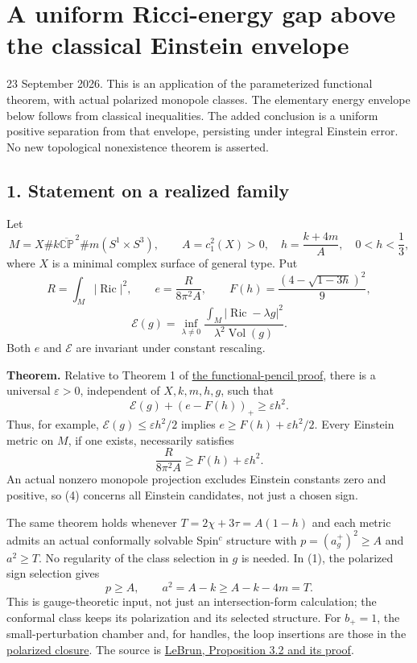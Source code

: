 \documentclass[
  11pt,
]{article}
\author{}
\date{23 September 2026}
\begin{document}
\hypertarget{a-uniform-ricci-energy-gap-above-the-classical-einstein-envelope}{%
\section{A uniform Ricci-energy gap above the classical Einstein
envelope}\label{a-uniform-ricci-energy-gap-above-the-classical-einstein-envelope}}

23 September 2026. This is an application of the parameterized
functional theorem, with actual polarized monopole classes. The
elementary energy envelope below follows from classical inequalities.
The added conclusion is a uniform positive separation from that
envelope, persisting under integral Einstein error. No new topological
nonexistence theorem is asserted.

\hypertarget{statement-on-a-realized-family}{%
\subsection{1. Statement on a realized
family}\label{statement-on-a-realized-family}}

Let \[
 M=X\#k\overline{\mathbb {CP}}^{\,2}\#m(S^1\times S^3),\qquad
 A=c_1^2(X)>0,\quad h=\frac{k+4m}{A},\quad 0<h<\frac13,
 \tag{1}
\] where \(X\) is a minimal complex surface of general type. Put \[
 R=\int_M|\operatorname{Ric}|^2,\qquad
 e=\frac{R}{8\pi^2A},\qquad
 F(h)=\frac{(4-\sqrt{1-3h})^2}{9},
\] \[
 \mathcal E(g)=\inf_{\lambda\ne0}
 \frac{\int_M|\operatorname{Ric}-\lambda g|^2}
      {\lambda^2\operatorname{Vol}(g)}.
 \tag{2}
\] Both \(e\) and \(\mathcal E\) are invariant under constant rescaling.

\textbf{Theorem.} Relative to Theorem 1 of
\href{line1_functional_pencil.md}{the functional-pencil proof}, there is
a universal \(\varepsilon>0\), independent of \(X,k,m,h,g\), such that
\[
 \boxed{\mathcal E(g)+(e-F(h))_+\ge\varepsilon h^2.}
 \tag{3}
\] Thus, for example, \(\mathcal E(g)\le\varepsilon h^2/2\) implies
\(e\ge F(h)+\varepsilon h^2/2\). Every Einstein metric on \(M\), if one
exists, necessarily satisfies \[
 \boxed{\frac{R}{8\pi^2A}\ge F(h)+\varepsilon h^2.}
 \tag{4}
\] An actual nonzero monopole projection excludes Einstein constants
zero and positive, so (4) concerns all Einstein candidates, not just a
chosen sign.

The same theorem holds whenever \(T=2\chi+3\tau=A(1-h)\) and each metric
admits an actual conformally solvable Spin\(^c\) structure with
\(p=(a_g^+)^2\ge A\) and \(a^2\ge T\). No regularity of the class
selection in \(g\) is needed. In (1), the polarized sign selection gives
\[
 p\ge A,\qquad a^2=A-k\ge A-k-4m=T.
 \tag{5}
\] This is gauge-theoretic input, not just an intersection-form
calculation; the conformal class keeps its polarization and its selected
structure. For \(b_+=1\), the small-perturbation chamber and, for
handles, the loop insertions are those in the
\href{lebrun_stability_closure.md}{polarized closure}. The source is
\href{https://arxiv.org/pdf/math/0003068}{LeBrun, Proposition 3.2 and
its proof}.
\end{document}
